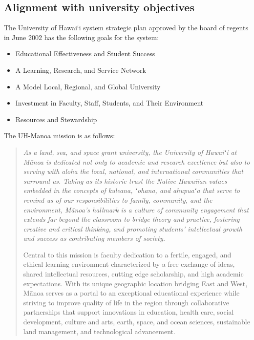 \documentclass[12pt]{article}
\begin{document}
\subsection{Alignment with university objectives}


The University of Hawai`i system strategic plan  approved by the board of regents in June 2002 has the following goals for the system:
\begin{itemize}
\item Educational Effectiveness and Student Success
\item A Learning, Research, and Service Network
\item A Model Local, Regional, and Global University
\item Investment in Faculty, Staff, Students, and Their Environment
\item Resources and Stewardship
\end{itemize}

The UH-Manoa mission is as follows:

\begin{quotation}
{\em As a land, sea, and space grant university, the University of Hawaiʻi at Mānoa is dedicated not only to academic and research excellence but also to serving with aloha the local, national, and international communities that surround us. Taking as its historic trust the Native Hawaiian values embedded in the concepts of kuleana, ʻohana, and ahupuaʻa that serve to remind us of our responsibilities to family, community, and the environment, Mānoa’s hallmark is a culture of community engagement that extends far beyond the classroom to bridge theory and practice, fostering creative and critical thinking, and promoting students’ intellectual growth and success as contributing members of society.

Central to this mission is faculty dedication to a fertile, engaged, and ethical learning environment characterized by a free exchange of ideas, shared intellectual resources, cutting edge scholarship, and high academic expectations. With its unique geographic location bridging East and West, Mānoa serves as a portal to an exceptional educational experience while striving to improve quality of life in the region through collaborative partnerships that support innovations in education, health care, social development, culture and arts, earth, space, and ocean sciences, sustainable land management, and technological advancement.}
\end{quotation}
\end{document}
